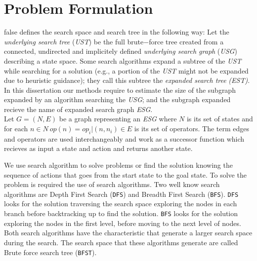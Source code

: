 \section{Problem Formulation}
\if false
\cite{lelis2013predicting} defines the search space and search tree in the following way: Let the \textit{underlying search tree} (\textit{UST}) be the full brute$-$force tree created from a connected, undirected and implicitely defined \textit{underlying search graph} (\textit{USG}) describing a state space. Some search algorithms expand a subtree of the \textit{UST} while searching for a solution (\textsf{e.g.,} a portion of the \textit{UST} might not be expanded due to heuristic guidance); they call this subtree the \textit{expanded search tree} \textit{(EST)}.\\

In this dissertation our methods require to estimate the size of the subgraph expanded by an algorithm searching the \textit{USG}; and the subgraph expanded recieve the name of expanded search graph \textit{ESG}.\\

Let $G = (N,E)$ be a graph representing an \textit{ESG} where $N$ is its set of states and for each $n \in N\  op(n) = {op_{i}|(n, n_i) \in E}$ is its set of operators. The term edges and operators are used interchangeably and work as a successor function which recieves as input a state and action and returns another state.\\
\fi

We use search algorithm to solve problems or find the solution knowing the sequence of actions that goes from the start state to the goal state. To solve the problem is required the use of search algorithms. Two well know search algorithms are Depth First Search (\texttt{DFS}) and Breadth First Search (\texttt{BFS}). \texttt{DFS} looks for the solution traversing the search space exploring the nodes in each branch before backtracking up to find the solution. \texttt{BFS} looks for the solution exploring the nodes in the first level, before moving to the next level of nodes. Both search algorithms have the characteristic that generate a larger search space during the search. The search space that these algorithms generate are called Brute force search tree (\texttt{BFST}).\\


\iffalse

